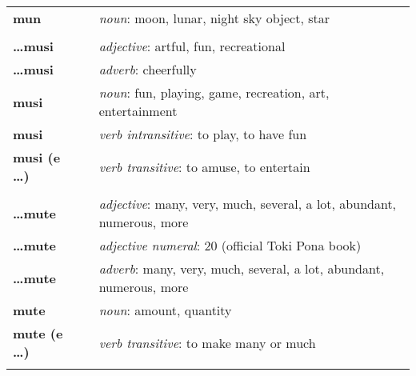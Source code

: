 \begin{supertabular}{p{2,5cm}|ll}
    \textbf{mun}                 &  & \textit{noun}: moon, lunar, night sky object, star                                                         \\
                                 &  &                                                                                                            \\
    \textbf{\dots musi}          &  & \textit{adjective}: artful, fun, recreational                                                              \\
    \textbf{\dots musi}          &  & \textit{adverb}: cheerfully                                                                                \\
    \textbf{musi}                &  & \textit{noun}: fun, playing, game, recreation, art, entertainment                                          \\
    \textbf{musi}                &  & \textit{verb intransitive}: to play, to have fun                                                           \\
    \textbf{musi (e \dots)}      &  & \textit{verb transitive}: to amuse, to entertain                                                           \\
                                 &  &                                                                                                            \\
    \textbf{\dots mute}          &  & \textit{adjective}: many, very, much, several, a lot, abundant, numerous, more                             \\
    \textbf{\dots mute}          &  & \textit{adjective numeral}: 20 (official Toki Pona book)                                                   \\
    \textbf{\dots mute}          &  & \textit{adverb}: many, very, much, several, a lot, abundant, numerous, more                                \\
    \textbf{mute}                &  & \textit{noun}: amount, quantity                                                                            \\
    \textbf{mute (e \dots)}      &  & \textit{verb transitive}: to make many or much                                                             \\
                                 &  &                                                                                                            \\

\end{supertabular}
